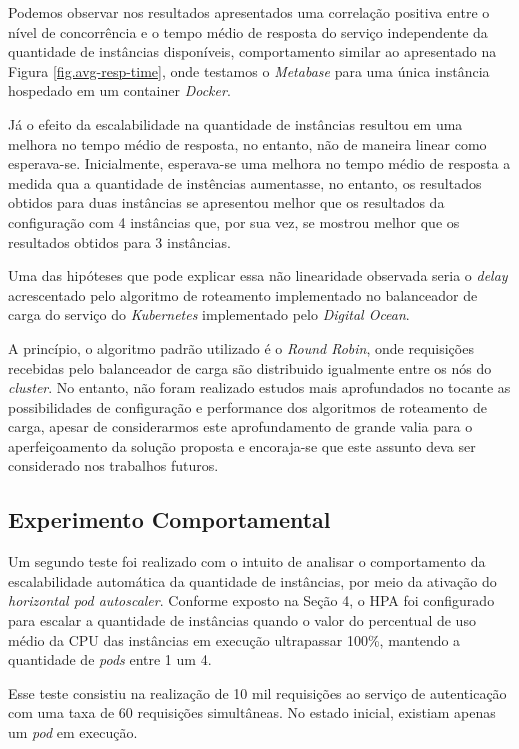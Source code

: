 Podemos observar nos resultados apresentados uma correlação positiva entre o nível de concorrência e o tempo médio de resposta do serviço independente da quantidade de instâncias disponíveis, comportamento similar ao apresentado na Figura \ref{fig.avg-resp-time}, onde testamos o \textit{Metabase} para uma única instância hospedado em um container \textit{Docker}. 

Já o efeito da escalabilidade na quantidade de instâncias resultou em uma melhora no tempo médio de resposta, no entanto, não de maneira linear como esperava-se. Inicialmente, esperava-se uma melhora no tempo médio de resposta a medida qua a quantidade de instências aumentasse, no entanto, os resultados obtidos para duas instâncias se apresentou melhor que os resultados da configuração com 4 instâncias que, por sua vez, se mostrou melhor que os resultados obtidos para 3 instâncias. 

Uma das hipóteses que pode explicar essa não linearidade observada seria o \textit{delay} acrescentado pelo algoritmo de roteamento implementado no balanceador de carga do serviço do \textit{Kubernetes} implementado pelo \textit{Digital Ocean}. 

A princípio, o algoritmo padrão utilizado é o \textit{Round Robin}, onde requisições recebidas pelo balanceador de carga são distribuido igualmente entre os nós do \textit{cluster}. No entanto, não foram realizado estudos mais aprofundados no tocante as possibilidades de configuração e performance dos algoritmos de roteamento de carga, apesar de considerarmos este aprofundamento de grande valia para o aperfeiçoamento da solução proposta e encoraja-se que este assunto deva ser considerado nos trabalhos futuros.

\subsection{Experimento Comportamental}

Um segundo teste foi realizado com o intuito de analisar o comportamento da escalabilidade automática da quantidade de instâncias, por meio da ativação do \textit{horizontal pod autoscaler}. Conforme exposto na Seção 4, o HPA foi configurado para escalar a quantidade de instâncias quando o valor do percentual de uso médio da CPU das instâncias em execução ultrapassar 100\%, mantendo a quantidade de \textit{pods} entre 1 um 4. 

Esse teste consistiu na realização de 10 mil requisições ao serviço de autenticação com uma taxa de 60 requisições simultâneas. No estado inicial, existiam apenas um \textit{pod} em execução. 

